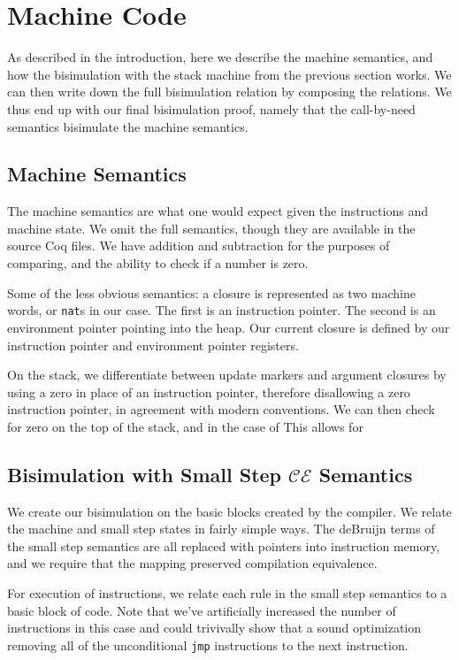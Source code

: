 \section{Machine Code}

As described in the introduction, here we describe the machine semantics, and
how the bisimulation with the stack machine from the previous section works.
We can then write down the full bisimulation relation by composing the
relations. We thus end up with our final bisimulation proof, namely that the
call-by-need semantics bisimulate the machine semantics. 

\subsection{Machine Semantics}

The machine semantics are what one would expect given the instructions and
machine state. We omit the full semantics, though they are available in the
source Coq files. We have addition and subtraction for the purposes of
comparing, and the ability to check if a number is zero. 

Some of the less obvious semantics: a closure is represented as two machine
words, or \texttt{nat}s in our case. The first is an instruction pointer. The
second is an environment pointer pointing into the heap. Our current closure is
defined by our instruction pointer and environment pointer registers. 

On the stack, we differentiate between update markers and argument closures by
using a zero in place of an instruction pointer, therefore disallowing a zero
instruction pointer, in agreement with modern conventions. We can then check for
zero on the top of the stack, and in the case of This allows for  

\subsection{Bisimulation with Small Step $\mathcal{CE}$ Semantics}

We create our bisimulation on the basic blocks created by the compiler. We
relate the machine and small step states in fairly simple ways. The deBruijn
terms of the small step semantics are all replaced with pointers into
instruction memory, and we require that the mapping preserved compilation
equivalence. 

For execution of instructions, we relate each rule in the small step semantics
to a basic block of code. Note that we've artificially increased the number of
instructions in this case and could trivivally show that a sound optimization
removing all of the unconditional \texttt{jmp} instructions to the next
instruction. 

